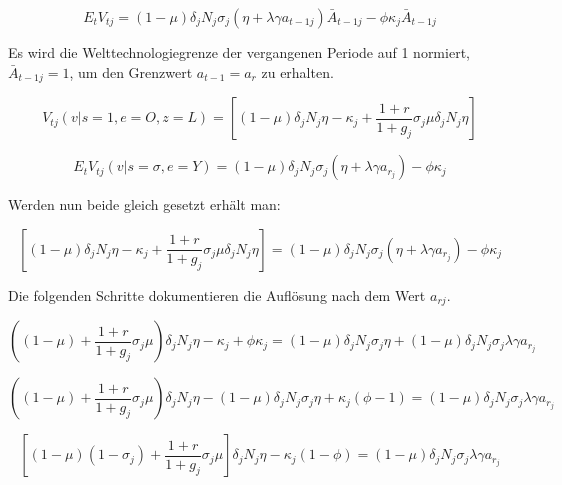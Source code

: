 \begin{equation}
E_{t}V_{tj}= (1- \mu) \delta_{j} N_{j} \sigma_{j}(\eta + \lambda \gamma a_{t-1j}) \bar{A}_{t-1j} - \phi \kappa_{j} \bar{A}_{t-1j}
\end{equation}


Es wird die Welttechnologiegrenze der vergangenen Periode auf 1 normiert, $\bar{A}_{t-1j} = 1$, um den Grenzwert $ a_{t-1} = a_r $ zu erhalten.


\begin{equation}
V_{tj}(v| s=1, e=O, z=L) =\left [ (1- \mu) \delta_{j} N_{j} \eta - \kappa_{j} + \frac{1+r}{1+g_{j}} \sigma_{j} \mu \delta_{j} N_{j} \eta \right]
\end{equation}


\begin{equation}
E_{t}V_{tj}(v| s=\sigma, e=Y) = (1- \mu) \delta_{j} N_{j} \sigma_{j} (\eta + \lambda \gamma a_{r_{j}}) - \phi \kappa_{j}
\end{equation}


Werden nun beide gleich gesetzt erhält man: 


\begin{equation}
\left [ (1-\mu) \delta_{j} N_{j} \eta - \kappa_{j} + \frac{1+r}{1+g_{j}} \sigma_{j} \mu \delta_{j}N_{j} \eta  \right ]= (1- \mu) \delta_{j} N_{j} \sigma_{j} (\eta + \lambda \gamma a_{r_{j}}) - \phi \kappa_{j}
\end{equation}


Die folgenden Schritte dokumentieren die Auflösung nach dem Wert $a_{rj}$.


\begin{equation}
\left((1-\mu) +\frac{1+r}{1+g_{j}} \sigma_{j} \mu \right) \delta_{j} N_{j} \eta - \kappa_{j} + \phi \kappa_{j} = (1- \mu) \delta_{j} N_{j} \sigma_{j} \eta + (1- \mu) \delta_{j} N_{j} \sigma_{j} \lambda \gamma a_{r_{j}}
\end{equation}


\begin{equation}
\left((1-\mu) +\frac{1+r}{1+g_{j}} \sigma_{j} \mu \right) \delta_{j} N_{j} \eta - (1- \mu) \delta_{j} N_{j} \sigma_{j} \eta + \kappa_{j}( \phi -1)= (1- \mu) \delta_{j} N_{j} \sigma_{j} \lambda \gamma a_{r_{j}}
\end{equation}


\begin{equation}
\left [ (1- \mu) (1- \sigma _{j}) + \frac{1+r}{1+g_{j}} \sigma_{j} \mu \right ] \delta_{j} N_{j} \eta - \kappa_{j}(1- \phi) =(1- \mu) \delta_{j} N_{j} \sigma_{j} \lambda \gamma a_{r_{j}}
\end{equation}


